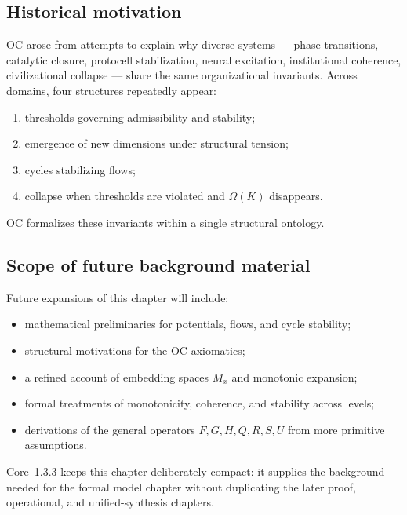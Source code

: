 \subsection{Historical motivation}

OC arose from attempts to explain why diverse systems — phase transitions, catalytic closure, protocell stabilization, neural excitation, institutional coherence, civilizational collapse — share the same organizational invariants.  
Across domains, four structures repeatedly appear:

\begin{enumerate}
    \item thresholds governing admissibility and stability;
    \item emergence of new dimensions under structural tension;
    \item cycles stabilizing flows;
    \item collapse when thresholds are violated and \(\Omega(K)\) disappears.
\end{enumerate}

OC formalizes these invariants within a single structural ontology.

\subsection{Scope of future background material}

Future expansions of this chapter will include:

\begin{itemize}
    \item mathematical preliminaries for potentials, flows, and cycle stability;
    \item structural motivations for the OC axiomatics;
    \item a refined account of embedding spaces \(M_x\) and monotonic expansion;
    \item formal treatments of monotonicity, coherence, and stability across levels;
    \item derivations of the general operators \(F,G,H,Q,R,S,U\) from more primitive assumptions.
\end{itemize}

Core~1.3.3 keeps this chapter deliberately compact: it supplies the background
needed for the formal model chapter without duplicating the later proof,
operational, and unified-synthesis chapters.
